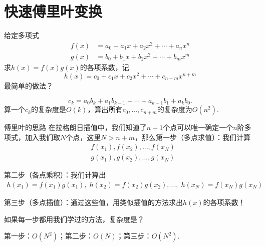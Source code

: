 \documentclass{beamer}
\begin{document}
\section{快速傅里叶变换}

\begin{frame}
    给定多项式
    \begin{align*}
        f(x) &= a_0 + a_1x + a_2x^2 + \cdots + a_nx^n\\
        g(x) &= b_0 + b_1x + b_2x^2 + \cdots + b_mx^m
    \end{align*}
    求$h(x)=f(x)g(x)$的各项系数，记
    \begin{equation*}
        h(x) = c_0 + c_1x + c_2x^2 + \cdots  + c_{n+m}x^{n+m}
    \end{equation*}
    最简单的做法？
    \pause

    \begin{equation*}
        c_k=a_0b_k + a_1b_{k-1} + \cdots  + a_{k-1}b_1 + a_kb_0.
    \end{equation*}
    算一个$c_k$的复杂度是$O(k)$，算出所有$c_0,...,c_{n+m}$的复杂度为$O(n^2)$.
\end{frame}

\begin{frame}{傅里叶的思路}
    在拉格朗日插值中，我们知道了$n+1$个点可以唯一确定一个$n$阶多项式，加入我们取$N$个点，这里$N>n+m$，那么第一步（多点求值）：我们计算
    \begin{align*}
        & f(x_1), f(x_2), ..., f(x_N)\\
        & g(x_1), g(x_2), ..., g(x_N)
    \end{align*}

    第二步（各点乘积）：我们计算出
    \begin{align*}
        h(x_1)=f(x_1)g(x_1),\;h(x_2)=f(x_2)g(x_2),...,\;h(x_N)=f(x_N)g(x_N)
    \end{align*}

    第三步（多点插值）：通过这些值，用类似插值的方法求出$h(x)$的各项系数！

    如果每一步都用我们学过的方法，复杂度是？
    \pause

    \vspace{1em}
    第一步：$O(N^2)$；第二步：$O(N)$；第三步：$O(N^2)$.
\end{frame}
\end{document}
